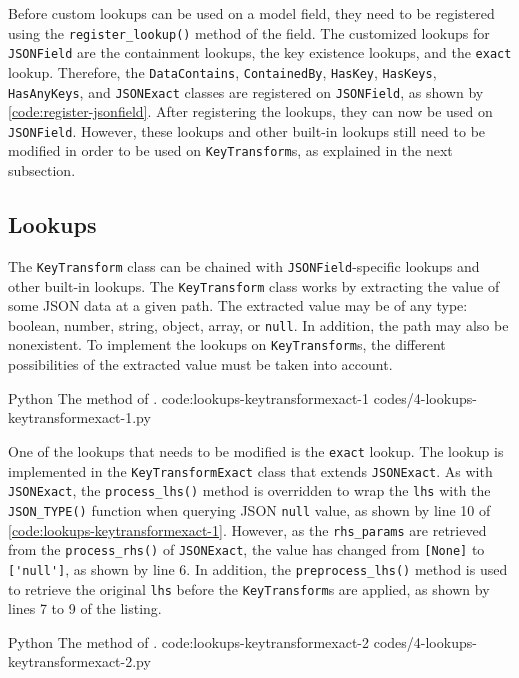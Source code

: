 Before custom lookups can be used on a model field, they need to be registered
using the \verb|register_lookup()| method of the field. The customized lookups
for \verb|JSONField| are the containment lookups, the key existence lookups,
and the \verb|exact| lookup. Therefore, the \verb|DataContains|,
\verb|ContainedBy|, \verb|HasKey|, \verb|HasKeys|, \verb|HasAnyKeys|, and
\verb|JSONExact| classes are registered on \verb|JSONField|, as shown by
\autoref{code:register-jsonfield}. After registering the lookups, they can now
be used on \verb|JSONField|. However, these lookups and other built-in lookups
still need to be modified in order to be used on \verb|KeyTransform|s, as
explained in the next subsection.

\subsection{ Lookups}

The \verb|KeyTransform| class can be chained with \verb|JSONField|-specific
lookups and other built-in lookups. The \verb|KeyTransform| class works by
extracting the value of some JSON data at a given path. The extracted value
may be of any type: boolean, number, string, object, array, or \verb|null|.
In addition, the path may also be nonexistent. To implement the lookups on
\verb|KeyTransform|s, the different possibilities of the extracted value must
be taken into account.

\listing
{Python}
{The  method of .}
{code:lookups-keytransformexact-1}
{codes/4-lookups-keytransformexact-1.py}

One of the lookups that needs to be modified is the \verb|exact| lookup. The
lookup is implemented in the \verb|KeyTransformExact| class that extends
\verb|JSONExact|. As with \verb|JSONExact|, the \verb|process_lhs()| method is
overridden to wrap the \verb|lhs| with the \verb|JSON_TYPE()| function when
querying JSON \verb|null| value, as shown by line 10 of
\autoref{code:lookups-keytransformexact-1}. However, as the \verb|rhs_params|
are retrieved from the \verb|process_rhs()| of \verb|JSONExact|, the value has
changed from \verb|[None]| to \verb|['null']|, as shown by line 6. In addition,
the \verb|preprocess_lhs()| method is used to retrieve the original \verb|lhs|
before the \verb|KeyTransform|s are applied, as shown by lines 7 to 9 of the
listing.

\listing
{Python}
{The  method of .}
{code:lookups-keytransformexact-2}
{codes/4-lookups-keytransformexact-2.py}

